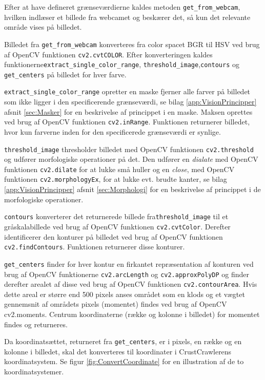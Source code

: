 Efter at have defineret grænseværdierne kaldes metoden \texttt{get\_from\_webcam}, hvilken indlæser et billede fra webcamet og beskærer det, så kun det relevante område vises på billedet.

Billedet fra \texttt{get\_from\_webcam} konverteres fra color spacet BGR til HSV ved brug af OpenCV funktionen \texttt{cv2.cvtCOLOR}.
Efter konverteringen kaldes funktionerne\newline \texttt{extract\_single\_color\_range}, \texttt{threshold\_image},\newline \texttt{contours} og \texttt{get\_centers} på billedet for hver farve.

\texttt{extract\_single\_color\_range} opretter en maske fjerner alle farver på billedet som ikke ligger i den specificerende grænseværdi, se bilag \ref{app:VisionPrincipper} afsnit \vref{sec:Masker} for en beskrivelse af princippet i en maske.
Maksen oprettes ved brug af OpenCV funktionen \texttt{cv2.inRange}.
Funktionen returnerer billedet, hvor kun farverne inden for den specificerede grænseværdi er synlige.

\texttt{threshold\_image} thresholder billedet med OpenCV funktionen \texttt{cv2.threshold} og udfører morfologiske operationer på det.
Den udfører en \textit{dialate} med OpenCV funktionen \texttt{cv2.dilate} for at lukke små huller og en \textit{close}, med OpenCV funktionen \texttt{cv2.morphologyEx}, for at lukke evt. brudte kanter, se bilag \ref{app:VisionPrincipper} afsnit \vref{sec:Morphologi} for en beskrivelse af princippet i de morfologiske operationer.

\texttt{contours} konverterer det returnerede billede fra\newline \texttt{threshold\_image} til et gråskalabillede ved brug af OpenCV funktionen \texttt{cv2.cvtColor}.
Derefter identificerer den konturer på billedet ved brug af OpenCV funktionen \texttt{cv2.findContours}.
Funktionen returnerer disse konturer.

\texttt{get\_centers} finder for hver kontur en firkantet repræsentation af konturen ved brug af OpenCV funktionerne \texttt{cv2.arcLength} og \texttt{cv2.approxPolyDP} og finder derefter arealet af disse ved brug af OpenCV funktionen \texttt{cv2.contourArea}.
Hvis dette areal er større end 500 pixels anses området som en klods og et vægtet gennemsnit af områdets pixels (momentet) findes ved brug af OpenCV cv2.moments.
Centrum koordinaterne (række og kolonne i billedet) for momentet findes og returneres. 

Da koordinatsættet, returneret fra \texttt{get\_centers}, er i pixels, en række og en kolonne i billedet, skal det konverteres til koordinater i CrustCrawlerens koordinatsystem.
Se figur \vref{fig:ConvertCoordinate} for en illustration af de to koordinatsystemer.

